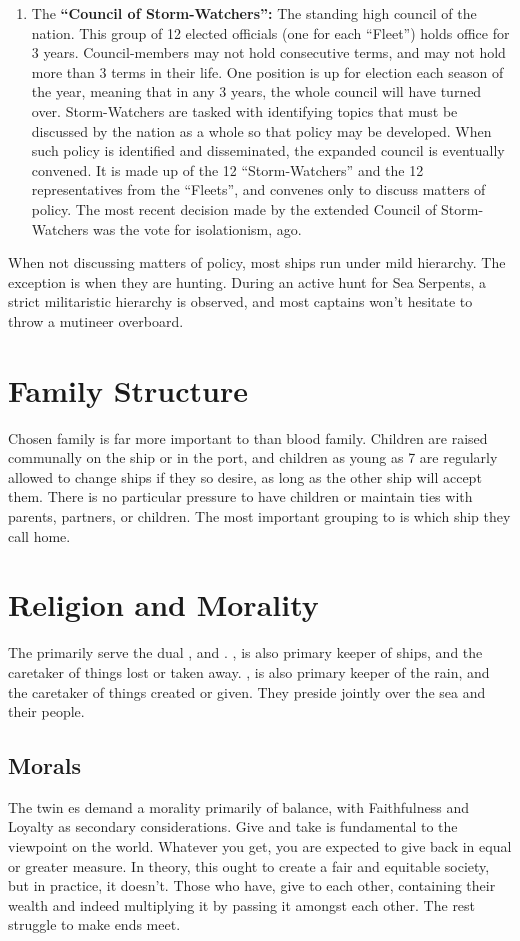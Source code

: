 \documentclass[blue]{GL2020}
\begin{document}
\begin{enumerate}
		\item The {\bf``Council of Storm-Watchers'':} The standing high council of the \pShip{} nation. This group of 12 elected officials (one for each ``Fleet'') holds office for 3 years. Council-members may not hold consecutive terms, and may not hold more than 3 terms in their life. One position is up for election each season of the year, meaning that in any 3 years, the whole council will have turned over. Storm-Watchers are tasked with identifying topics that must be discussed by the nation as a whole so that policy may be developed. When such policy is identified and disseminated, the expanded council is eventually convened. It is made up of the 12 ``Storm-Watchers'' and the 12 representatives from the ``Fleets'', and convenes only to discuss matters of policy. The most recent decision made by the extended Council of Storm-Watchers was the vote for isolationism, \pIsolation{} ago.
\end{enumerate}

When not discussing matters of policy, most ships run under mild hierarchy. The exception is when they are hunting. During an active hunt for Sea Serpents, a strict militaristic hierarchy is observed, and most captains won't hesitate to throw a mutineer overboard.

\section*{Family Structure}
Chosen family is far more important to \pShippies{} than blood family. Children are raised communally on the ship or in the port, and children as young as 7 are regularly allowed to change ships if they so desire, as long as the other ship will accept them. There is no particular pressure to have children or maintain ties with parents, partners, or children. The most important grouping to \pShippies{} is which ship they call home.

\section*{Religion and Morality}
The \pShippies{} primarily serve the dual \cEbb{\God}, \cEbb{} and \cFlow{}. \cEbbFull{\MYname}, is also primary keeper of ships, and the caretaker of things lost or taken away. \cFlowFull{\MYname}, is also primary keeper of the rain, and the caretaker of things created or given. They preside jointly over the sea and their people.


\subsection*{Morals}
The twin \cEbb{\God}es demand a morality primarily of balance, with Faithfulness and Loyalty as secondary considerations. Give and take is fundamental to the \pShip{} viewpoint on the world. Whatever you get, you are expected to give back in equal or greater measure. In theory, this ought to create a fair and equitable society, but in practice, it doesn't. Those who have, give to each other, containing their wealth and indeed multiplying it by passing it amongst each other. The rest struggle to make ends meet. 
\end{document}
